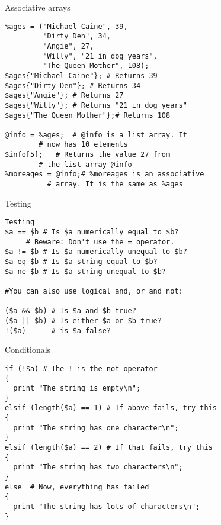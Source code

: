 \begin{frame}[containsverbatim]{Associative arrays}
\lstset{language=perl}
\begin{lstlisting}
%ages = ("Michael Caine", 39,
         "Dirty Den", 34,
         "Angie", 27,
         "Willy", "21 in dog years",
         "The Queen Mother", 108);
$ages{"Michael Caine"};	# Returns 39
$ages{"Dirty Den"}; # Returns 34
$ages{"Angie"};	# Returns 27
$ages{"Willy"};	# Returns "21 in dog years"
$ages{"The Queen Mother"};# Returns 108

@info = %ages;	# @info is a list array. It
		# now has 10 elements
$info[5];	# Returns the value 27 from
		# the list array @info
%moreages = @info;# %moreages is an associative
		  # array. It is the same as %ages
\end{lstlisting}
\end{frame}


\begin{frame}[containsverbatim]{Testing}
\lstset{language=perl}
\begin{lstlisting}
Testing
$a == $b # Is $a numerically equal to $b?
	 # Beware: Don't use the = operator.
$a != $b # Is $a numerically unequal to $b?
$a eq $b # Is $a string-equal to $b?
$a ne $b # Is $a string-unequal to $b?

#You can also use logical and, or and not: 

($a && $b) # Is $a and $b true?
($a || $b) # Is either $a or $b true?
!($a)      # is $a false?
\end{lstlisting}
\end{frame}

\begin{frame}[containsverbatim]{Conditionals}
\lstset{language=perl}
\begin{lstlisting}
if (!$a) # The ! is the not operator
{
  print "The string is empty\n";
}
elsif (length($a) == 1)	# If above fails, try this
{
  print "The string has one character\n";
}
elsif (length($a) == 2)	# If that fails, try this
{
  print "The string has two characters\n";
}
else  # Now, everything has failed
{
  print "The string has lots of characters\n";
}
\end{lstlisting}
\end{frame}



